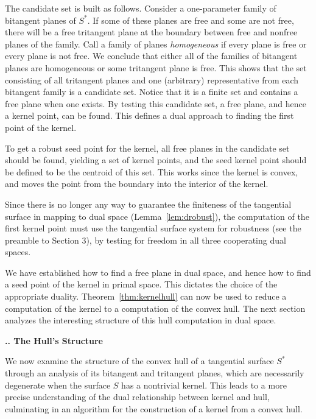 \documentclass[twoside]{article}
\newcounter{sectionc}\newcounter{subsectionc}\newcounter{subsubsectionc}
\renewcommand{\subsection}[1] {\vspace{12pt}\addtocounter{subsectionc}{1} 
	\setcounter{subsubsectionc}{0}\noindent 
	{\bf\thesectionc.\thesubsectionc. {\kern1pt \bfit #1}}\par\vspace{5pt}}
\begin{document}
The candidate set is built as follows.
Consider a one-parameter family of bitangent planes of $S^*$.
If some of these planes are free and some are not free,
there will be a free tritangent plane at the boundary
between free and nonfree planes of the family.
Call a family of planes {\em homogeneous} if every plane is
free or every plane is not free.
We conclude that either all of the families of bitangent planes
are homogeneous or some tritangent plane is free.
This shows that the set consisting of all tritangent planes
and one (arbitrary) representative from each bitangent family
is a candidate set.
Notice that it is a finite set and contains a free plane when one exists.
By testing this candidate set, a free plane, and hence a kernel point, can be found.
This defines a dual approach to finding the first point of the kernel.

To get a robust seed point for the kernel,
all free planes in the candidate set should be found,
yielding a set of kernel points, and the seed kernel point 
should be defined to be the centroid of this set.
This works since the kernel is convex, and moves the point from the boundary
into the interior of the kernel.

Since there is no longer any way to guarantee the finiteness of the tangential surface
in mapping to dual space (Lemma~\ref{lem:drobust}),
the computation of the first kernel point must use the tangential surface system 
for robustness (see the preamble to Section 3),
by testing for freedom in all three cooperating dual spaces.

We have established how to find a free plane in dual space,
and hence how to find a seed point of the kernel in primal space.
This dictates the choice of the appropriate duality.
Theorem~\ref{thm:kernelhull} can now be used to reduce a computation
of the kernel to a computation of the convex hull.
The next section analyzes the interesting structure of this hull computation in dual space.


\subsection{The Hull's Structure}
\label{sec:cusp}
\noindent
We now examine the structure of the convex hull of a tangential
surface $S^*$ through an analysis of its bitangent and tritangent planes,
which are necessarily degenerate when the surface $S$ has a nontrivial kernel.
This leads to a more precise understanding of the 
dual relationship between kernel and hull, culminating in an
algorithm for the construction of a kernel from a convex hull.
\end{document}
